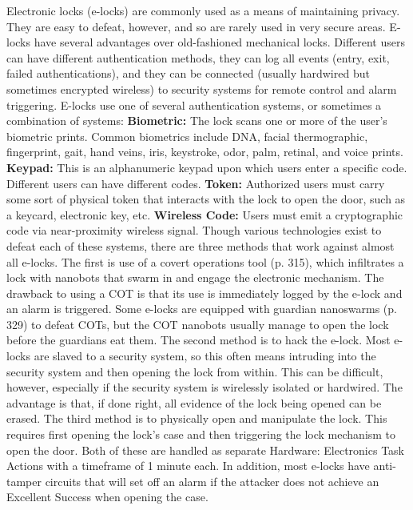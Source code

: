 Electronic locks (e-locks) are commonly used as a 
means of maintaining privacy. They are easy to defeat, 
however, and so are rarely used in very secure areas. 
E-locks have several advantages over old-fashioned 
mechanical locks. Different users can have different 
authentication methods, they can log all events (entry, 
exit, failed authentications), and they can be connected
(usually hardwired but sometimes encrypted
wireless) to security systems for remote control and 
alarm triggering.
E-locks use one of several authentication systems, 
or sometimes a combination of systems:
\textbf{Biometric:} The lock scans one or more of the user's 
biometric prints. Common biometrics include DNA, 
facial thermographic, fingerprint, gait, hand veins, iris, 
keystroke, odor, palm, retinal, and voice prints.
\textbf{Keypad:} This is an alphanumeric keypad upon 
which users enter a specific code. Different users can 
have different codes.
\textbf{Token:} Authorized users must carry some sort of 
physical token that interacts with the lock to open the 
door, such as a keycard, electronic key, etc.
\textbf{Wireless Code:} Users must emit a cryptographic 
code via near-proximity wireless signal.
Though various technologies exist to defeat each 
of these systems, there are three methods that work 
against almost all e-locks. The first is use of a covert 
operations tool (p. 315), which infiltrates a lock with 
nanobots that swarm in and engage the electronic 
mechanism. The drawback to using a COT is that its 
use is immediately logged by the e-lock and an alarm 
is triggered. Some e-locks are equipped with guardian 
nanoswarms (p. 329) to defeat COTs, but the COT 
nanobots usually manage to open the lock before the 
guardians eat them.
The second method is to hack the e-lock. Most 
e-locks are slaved to a security system, so this often 
means intruding into the security system and then 
opening the lock from within. This can be difficult, 
however, especially if the security system is wirelessly
isolated or hardwired. The advantage is that,
if done right, all evidence of the lock being opened 
can be erased.
The third method is to physically open and manipulate
the lock. This requires first opening the
lock's case and then triggering the lock mechanism 
to open the door. Both of these are handled as 
separate Hardware: Electronics Task Actions with 
a timeframe of 1 minute each. In addition, most e-locks
have anti-tamper circuits that will set off an
alarm if the attacker does not achieve an Excellent 
Success when opening the case.

